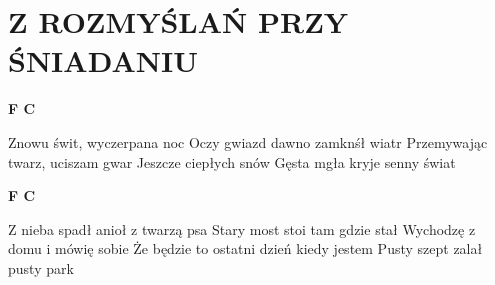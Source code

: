 \documentclass[../../../songbook.tex]{subfiles}
\begin{document}
\TabPositions{8cm} %
\section*{Z ROZMYŚLAŃ PRZY ŚNIADANIU}
{}
\vspace{0.5cm}
{\color{red}\textbf{F C} } \newline

Znowu świt, wyczerpana noc			 \newline
Oczy gwiazd dawno zamknśł wiatr		 \newline
Przemywając twarz, uciszam gwar		 \newline
Jeszcze ciepłych snów				 \newline
Gęsta mgła kryje senny świat		 \newline

{\color{red}\textbf{F C} } \newline

Z nieba spadł anioł z twarzą psa \newline
Stary most stoi tam gdzie stał \newline
Wychodzę z domu i mówię sobie \newline
Że będzie to ostatni dzień kiedy jestem  \newline
Pusty szept zalał pusty park \newline
\end{document}
